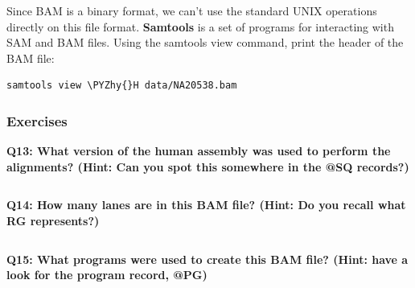 \documentclass[11pt]{article}
\makeatletter
\def\PYZhy{\char`\-}
\newcommand{\boxspacing}{\kern\kvtcb@left@rule\kern\kvtcb@boxsep}
\newcommand{\prompt}[4]{
        \ttfamily\llap{{\color{#2}\LARGE\faKeyboardO\hspace{3pt}#4}}\vspace{-\baselineskip}
    }
\makeatother
\begin{document}
    Since BAM is a binary format, we can't use the standard UNIX operations
directly on this file format. \textbf{Samtools} is a set of programs for
interacting with SAM and BAM files. Using the samtools view command,
print the header of the BAM file:

    \begin{tcolorbox}[breakable, size=fbox, boxrule=1pt, pad at break*=1mm,colback=cellbackground, colframe=cellborder]
\prompt{In}{incolor}{ }{\boxspacing}
\begin{Verbatim}[commandchars=\\\{\}]
samtools view \PYZhy{}H data/NA20538.bam
\end{Verbatim}
\end{tcolorbox}

    \hypertarget{exercises}{%
\subsubsection{Exercises}\label{exercises}}

    \textbf{Q13: What version of the human assembly was used to perform the
alignments? (Hint: Can you spot this somewhere in the @SQ records?)}

    \begin{tcolorbox}[breakable, size=fbox, boxrule=1pt, pad at break*=1mm,colback=cellbackground, colframe=cellborder]
\prompt{In}{incolor}{ }{\boxspacing}
\begin{Verbatim}[commandchars=\\\{\}]

\end{Verbatim}
\end{tcolorbox}

    \textbf{Q14: How many lanes are in this BAM file? (Hint: Do you recall
what RG represents?)}

    \begin{tcolorbox}[breakable, size=fbox, boxrule=1pt, pad at break*=1mm,colback=cellbackground, colframe=cellborder]
\prompt{In}{incolor}{ }{\boxspacing}
\begin{Verbatim}[commandchars=\\\{\}]

\end{Verbatim}
\end{tcolorbox}

    \textbf{Q15: What programs were used to create this BAM file? (Hint:
have a look for the program record, @PG)}

    \begin{tcolorbox}[breakable, size=fbox, boxrule=1pt, pad at break*=1mm,colback=cellbackground, colframe=cellborder]
\prompt{In}{incolor}{ }{\boxspacing}
\begin{Verbatim}[commandchars=\\\{\}]

\end{Verbatim}
\end{tcolorbox}
\end{document}
